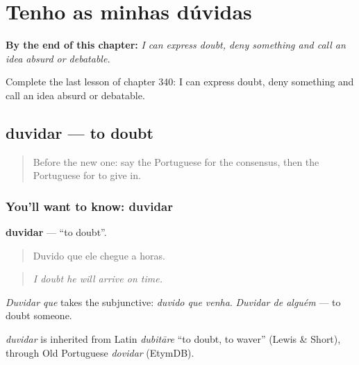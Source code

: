 
\chapter{Tenho as minhas dúvidas}
\label{ch:pt-tenho-as-minhas-duvidas}

\begin{chapteropening}
\textbf{By the end of this chapter:} \emph{I can express doubt, deny something and call an idea absurd or debatable.}

Complete the last lesson of chapter 340: I can express doubt, deny something and call an idea absurd or debatable.
\end{chapteropening}

\section[duvidar]{duvidar — to doubt}

\label{lesson:PT-C340-duvidar}



\begin{quote}
Before the new one: say the Portuguese for the consensus, then the Portuguese for to give in.
\end{quote}

\subsection*{You'll want to know: duvidar}
\textbf{duvidar} — \textquotedblleft{}to doubt\textquotedblright{}.

\begin{quote}
Duvido que ele chegue a horas.
\end{quote}

\begin{quote}
\emph{I doubt he will arrive on time.}
\end{quote}

\emph{Duvidar que} takes the subjunctive: \emph{duvido que venha}. \emph{Duvidar de alguém} — to doubt someone.

\begin{cousinweb}
\emph{duvidar} is inherited from Latin \emph{dubitāre} \textquotedblleft{}to doubt, to waver\textquotedblright{} (Lewis \& Short), through Old Portuguese \emph{dovidar} (EtymDB).
\end{cousinweb}

